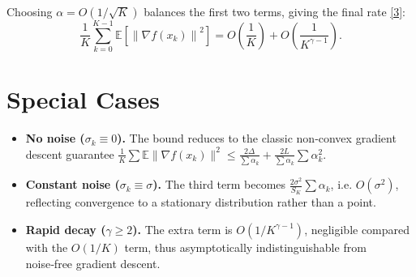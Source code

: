 \documentclass{article}
\newcommand{\E}{\mathbb{E}}
\newcommand{\norm}[1]{\left\|#1\right\|}
\begin{document}
Choosing $\alpha=O(1/\sqrt{K})$ balances the first two terms, giving the final rate \eqref{3}:
\[
\frac{1}{K}\sum_{k=0}^{K-1}\E\!\left[\norm{\nabla f(x_k)}^{2}\right]
= O\!\left(\frac{1}{K}\right)+O\!\left(\frac{1}{K^{\gamma-1}}\right).
\]

\section*{Special Cases}
\begin{itemize}
\item \textbf{No noise ($\sigma_k\equiv0$).} The bound reduces to the classic non‑convex gradient descent guarantee $\frac{1}{K}\sum\E\|\nabla f(x_k)\|^{2}\le \frac{2\Delta}{\sum\alpha_k}+ \frac{2L}{\sum\alpha_k}\sum\alpha_k^{2}$.
\item \textbf{Constant noise ($\sigma_k\equiv\sigma$).} The third term becomes $\frac{2\sigma^{2}}{S_K}\sum\alpha_k$, i.e. $O(\sigma^{2})$, reflecting convergence to a stationary distribution rather than a point.
\item \textbf{Rapid decay ($\gamma\ge2$).} The extra term is $O(1/K^{\gamma-1})$, negligible compared with the $O(1/K)$ term, thus asymptotically indistinguishable from noise‑free gradient descent.
\end{itemize}
\end{document}
